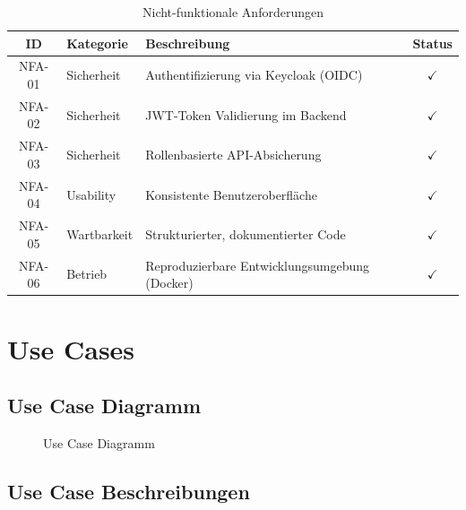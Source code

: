 \documentclass[a4paper,12pt,twoside]{report}
\newcommand{\cmark}{\textcolor{green!60!black}{$\checkmark$}}
\begin{document}
\begin{table}[H]
\centering
\caption{Nicht-funktionale Anforderungen}
\label{tab:nfa}
\begin{tabularx}{\textwidth}{c l X c}
\toprule
\textbf{ID} & \textbf{Kategorie} & \textbf{Beschreibung} & \textbf{Status} \\
\midrule
NFA-01 & Sicherheit & Authentifizierung via Keycloak (OIDC) & \cmark \\
NFA-02 & Sicherheit & JWT-Token Validierung im Backend & \cmark \\
NFA-03 & Sicherheit & Rollenbasierte API-Absicherung & \cmark \\
NFA-04 & Usability & Konsistente Benutzeroberfläche & \cmark \\
NFA-05 & Wartbarkeit & Strukturierter, dokumentierter Code & \cmark \\
NFA-06 & Betrieb & Reproduzierbare Entwicklungsumgebung (Docker) & \cmark \\
\bottomrule
\end{tabularx}
\end{table}

\newpage

\section{Use Cases}

\subsection{Use Case Diagramm}

\begin{figure}[H]
\centering
{}
\caption{Use Case Diagramm}
\label{fig:usecase}
\end{figure}

\newpage

\subsection{Use Case Beschreibungen}
\end{document}
